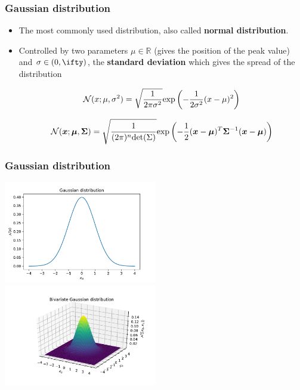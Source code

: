 \documentclass[notes]{beamer}          %
\newcommand{\vect}[1]{\bm{#1}}
\newcommand{\field}[1]{\mathbb{#1}}
\newcommand{\R}{\field{R}}
\begin{document}
\begin{frame}
\frametitle{Gaussian distribution}
\begin{itemize}
    \item The most commonly used distribution, also called {\bf normal distribution}.
    \item Controlled by two parameters $\mu \in \R$ (gives the position of the peak value) and $\sigma \in (0, \ifty)$, the {\bf standard deviation} which gives the spread of the distribution

    $$
    {\cal N}(x ; \mu, \sigma^2) = \sqrt{\frac{1}{2 \pi \sigma^2}} \mbox{exp} \left (-\frac{1}{2 \sigma^2}(x - \mu)^2 \right )
    $$

    $$
    {\cal N}(\vect{x} ; \vect{\mu}, \vect{\Sigma}) = \sqrt{\frac{1}{(2 \pi)^n \mbox{det}(\Sigma)}} \mbox{exp} \left (-\frac{1}{2} (\vect{x} - \vect{\mu})^T \vect{\Sigma}^{-1} (\vect{x} - \vect{\mu}) \right )
    $$


\end{itemize}
\end{frame}


\begin{frame}
\frametitle{Gaussian distribution}
\begin{center}
\includegraphics[width=0.5\textwidth]{figures/week_1/gaussian_1d.pdf}
\hfill
\includegraphics[width=0.5\textwidth]{figures/week_1/gaussian_2d.pdf}
\end{center}
\end{frame}
\end{document}
